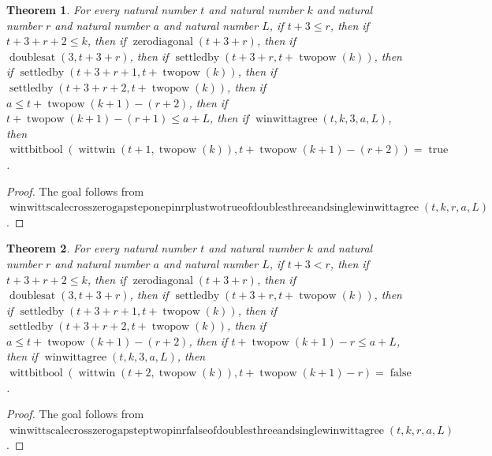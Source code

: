 \documentclass[11pt]{article}
\newtheorem{theorem}{Theorem}[section]
\theoremstyle{definition}
\begin{document}
\begin{theorem}
\label{ll:paper:winwitt-scale-cross-zero-gap-step-one-pin-r-plus-two-true-of-doubles-three-and-single-winwittagree}
For every natural number \(t\) and natural number \(k\) and natural number \(r\) and natural number \(a\) and natural number \(L\), if \(t + 3 \le r\), then if \(t + 3 + r + 2 \le k\), then if \(\operatorname{zerodiagonal}(t + 3 + r)\), then if \(\operatorname{doublesat}(3, t + 3 + r)\), then if \(\operatorname{settledby}(t + 3 + r, t + \operatorname{twopow}(k))\), then if \(\operatorname{settledby}(t + 3 + r + 1, t + \operatorname{twopow}(k))\), then if \(\operatorname{settledby}(t + 3 + r + 2, t + \operatorname{twopow}(k))\), then if \(a \le t + \operatorname{twopow}(k + 1) - (r + 2)\), then if \(t + \operatorname{twopow}(k + 1) - (r + 1) \le a + L\), then if \(\operatorname{winwittagree}(t, k, 3, a, L)\), then \(\operatorname{wittbitbool}(\operatorname{wittwin}(t + 1, \operatorname{twopow}(k)), t + \operatorname{twopow}(k + 1) - (r + 2)) = \operatorname{true}\).
\end{theorem}
\begin{proof}
The goal follows from \(\operatorname{winwittscalecrosszerogapsteponepinrplustwotrueofdoublesthreeandsinglewinwittagree}(t, k, r, a, L)\).
\end{proof}
\begin{theorem}
\label{ll:paper:winwitt-scale-cross-zero-gap-step-two-pin-r-false-of-doubles-three-and-single-winwittagree}
For every natural number \(t\) and natural number \(k\) and natural number \(r\) and natural number \(a\) and natural number \(L\), if \(t + 3 < r\), then if \(t + 3 + r + 2 \le k\), then if \(\operatorname{zerodiagonal}(t + 3 + r)\), then if \(\operatorname{doublesat}(3, t + 3 + r)\), then if \(\operatorname{settledby}(t + 3 + r, t + \operatorname{twopow}(k))\), then if \(\operatorname{settledby}(t + 3 + r + 1, t + \operatorname{twopow}(k))\), then if \(\operatorname{settledby}(t + 3 + r + 2, t + \operatorname{twopow}(k))\), then if \(a \le t + \operatorname{twopow}(k + 1) - (r + 2)\), then if \(t + \operatorname{twopow}(k + 1) - r \le a + L\), then if \(\operatorname{winwittagree}(t, k, 3, a, L)\), then \(\operatorname{wittbitbool}(\operatorname{wittwin}(t + 2, \operatorname{twopow}(k)), t + \operatorname{twopow}(k + 1) - r) = \operatorname{false}\).
\end{theorem}
\begin{proof}
The goal follows from \(\operatorname{winwittscalecrosszerogapsteptwopinrfalseofdoublesthreeandsinglewinwittagree}(t, k, r, a, L)\).
\end{proof}
\end{document}
